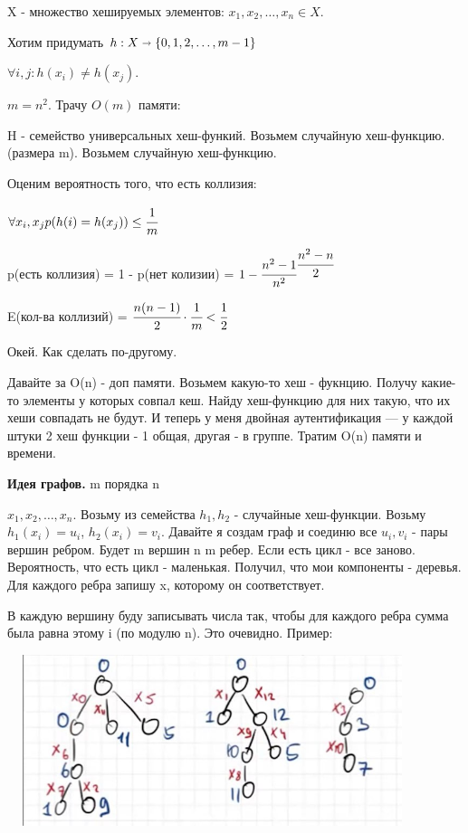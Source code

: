 \documentclass{article}
\begin{document}
X - множество хешируемых элементов: $x_1,x_2,\ldots, x_n \in X$.

Хотим придумать $h: X \shortrightarrow \{0,1,2,\ldots,m-1\}$

$\forall i,j: h(x_i) \neq h(x_j)$.

$m = n^2$. Трачу $O(m)$  памяти:

H - семейство универсальных хеш-функий. Возьмем случайную хеш-функцию.(размера m). Возьмем случайную хеш-функцию. 

Оценим вероятность того, что есть коллизия:

$\forall x_i,x_j p(h(i)=h(x_j))\leq \cfrac{1}{m}$

p(есть коллизия) = 1 - p(нет колизии) = $1 - \cfrac{n^2-1}{n^2}^{\cfrac{n^2-n}{2}}$

E(кол-ва коллизий) = $\cfrac{n (n-1)}{2} \cdot \cfrac{1}{m}<\cfrac{1}{2}$

Окей. Как сделать по-другому.

Давайте за O(n) - доп памяти.  Возьмем какую-то хеш - фукнцию. Получу какие-то элементы у которых совпал кеш. Найду хеш-функцию для них  такую, что их хеши совпадать не будут. И теперь у меня двойная аутентификация --- у каждой штуки 2 хеш функции - 1 общая, другая - в группе. Тратим O(n) памяти и времени.

\pagebreak
\textbf{Идея графов.} m порядка n

$x_1,x_2,\ldots, x_n$. Возьму из семейства $h_1,h_2$ - случайные хеш-функции. Возьму $h_1(x_i) = u_i$, $h_2(x_i) = v_i$. Давайте я создам граф и соединю все $u_i,v_i$ - пары вершин ребром. Будет m вершин n m ребер. Если есть цикл - все заново. Вероятность, что есть цикл - маленькая. Получил, что мои компоненты - деревья. Для каждого ребра запишу x, которому он соответствует.

В каждую вершину буду записывать числа так, чтобы для каждого ребра  сумма была равна этому i (по модулю n). Это очевидно. Пример:

\includegraphics[width=12cm, height=5cm]{13.1.jpg}
\end{document}
